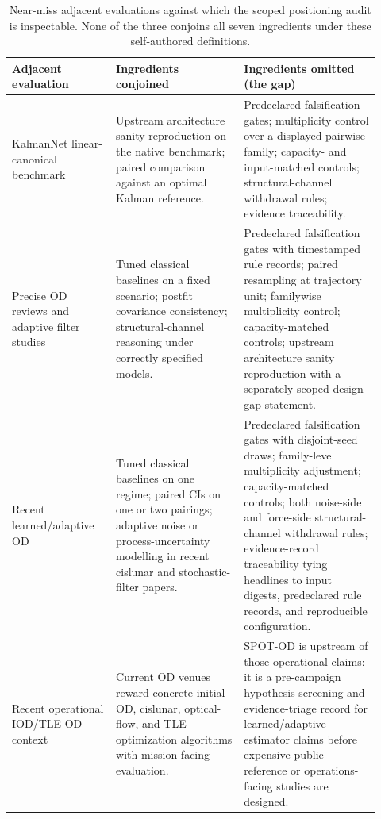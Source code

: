\documentclass{article}
\begin{document}
\begin{table}[t]
  \centering\small
  \caption{Near-miss adjacent evaluations against which the scoped positioning audit is inspectable. None of the three conjoins all seven ingredients under these self-authored definitions.}
  \label{tab:near_miss_audit}
  \begin{tabular}{p{0.26\linewidth}p{0.32\linewidth}p{0.34\linewidth}}
    \toprule
    Adjacent evaluation & Ingredients conjoined & Ingredients omitted (the gap) \\
    \midrule
    KalmanNet linear-canonical benchmark \cite{revach2022kalmannet} & Upstream architecture sanity reproduction on the native benchmark; paired comparison against an optimal Kalman reference. & Predeclared falsification gates; multiplicity control over a displayed pairwise family; capacity- and input-matched controls; structural-channel withdrawal rules; evidence traceability. \\
    Precise OD reviews and adaptive filter studies \cite{selvan2023precise,mehra1970adaptive,sage1969adaptive} & Tuned classical baselines on a fixed scenario; postfit covariance consistency; structural-channel reasoning under correctly specified models. & Predeclared falsification gates with timestamped rule records; paired resampling at trajectory unit; familywise multiplicity control; capacity-matched controls; upstream architecture sanity reproduction with a separately scoped design-gap statement. \\
    Recent learned/adaptive OD \cite{scorsoglio2023pinn,zhou2023lstm,zhang2024libration,pinheiro2024flexkalmannet,chen2024robust,zhu2025bayesian,gao2025heavytailed,sztamfater2026sequential} & Tuned classical baselines on one regime; paired CIs on one or two pairings; adaptive noise or process-uncertainty modelling in recent cislunar and stochastic-filter papers. & Predeclared falsification gates with disjoint-seed draws; family-level multiplicity adjustment; capacity-matched controls; both noise-side and force-side structural-channel withdrawal rules; evidence-record traceability tying headlines to input digests, predeclared rule records, and reproducible configuration. \\
    Recent operational IOD/TLE OD context \cite{smego2026dynamic,heidrich2025collocation,oliveira2026opticalflow,liu2026epsa} & Current OD venues reward concrete initial-OD, cislunar, optical-flow, and TLE-optimization algorithms with mission-facing evaluation. & SPOT-OD is upstream of those operational claims: it is a pre-campaign hypothesis-screening and evidence-triage record for learned/adaptive estimator claims before expensive public-reference or operations-facing studies are designed. \\
    \bottomrule
  \end{tabular}
\end{table}
\end{document}
